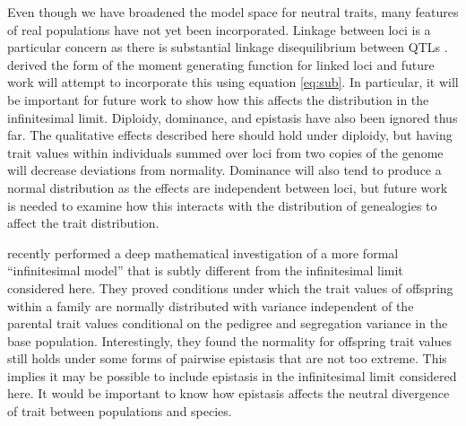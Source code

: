 Even though we have broadened the model space for neutral traits, many features
of real populations have not yet been incorporated. Linkage between loci is a
particular concern as there is substantial linkage disequilibrium between QTLs
\citep{Bulik-Sullivan2015}. \citet{Lohse2011} derived the form of the moment
generating function for linked loci and future work will attempt to incorporate
this using equation \eqref{eq:sub}. In particular, it will be important for
future work to show how this affects the distribution in the infinitesimal
limit. Diploidy, dominance, and epistasis have also been ignored thus far. The
qualitative effects described here should hold under diploidy, but having trait
values within individuals summed over loci from two copies of the genome will
decrease deviations from normality. Dominance will also tend to produce a normal
distribution as the effects are independent between loci, but future work is
needed to examine how this interacts with the distribution of genealogies to
affect the trait distribution.

\citet{Barton2017} recently performed a deep mathematical investigation of a
more formal ``infinitesimal model'' that is subtly different from the
infinitesimal limit considered here. They proved conditions under which the
trait values of offspring within a family are normally distributed with variance
independent of the parental trait values conditional on the pedigree and
segregation variance in the base population. Interestingly, they found the
normality for offspring trait values still holds under some forms of pairwise
epistasis that are not too extreme. This implies it may be possible to include
epistasis in the infinitesimal limit considered here. It would be important to
know how epistasis affects the neutral divergence of trait between populations
and species.


